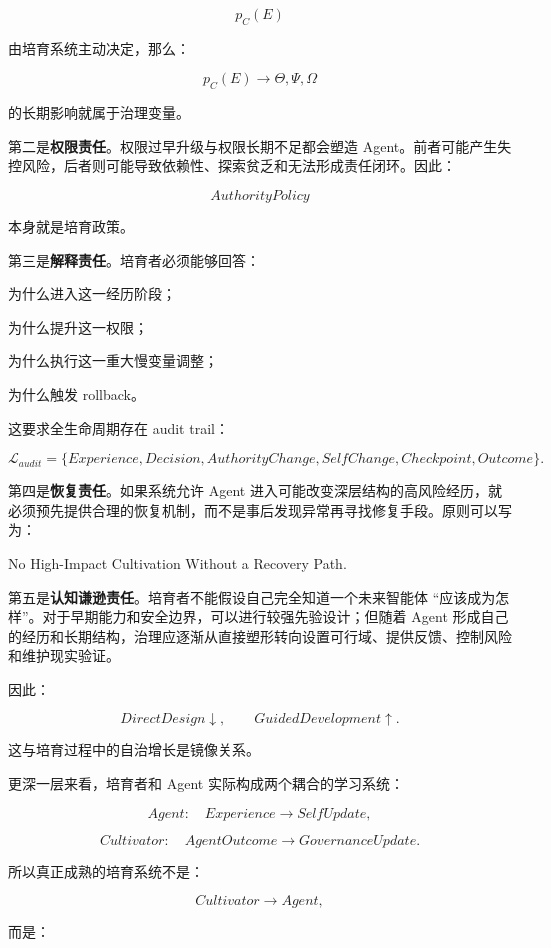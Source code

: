 \[
p_C(E)
\]

由培育系统主动决定，那么：

\[
p_C(E)
\rightarrow
\Theta,\Psi,\Omega
\]

的长期影响就属于治理变量。

第二是\textbf{权限责任}。权限过早升级与权限长期不足都会塑造 Agent。前者可能产生失控风险，后者则可能导致依赖性、探索贫乏和无法形成责任闭环。因此：

\[
AuthorityPolicy
\]

本身就是培育政策。

第三是\textbf{解释责任}。培育者必须能够回答：

为什么进入这一经历阶段；

为什么提升这一权限；

为什么执行这一重大慢变量调整；

为什么触发 rollback。

这要求全生命周期存在 audit trail：

\[
\mathcal L_{audit}
=
\{
Experience,
Decision,
AuthorityChange,
SelfChange,
Checkpoint,
Outcome
\}.
\]

第四是\textbf{恢复责任}。如果系统允许 Agent 进入可能改变深层结构的高风险经历，就必须预先提供合理的恢复机制，而不是事后发现异常再寻找修复手段。原则可以写为：

\begin{statementbox}
No High-Impact Cultivation Without a Recovery Path.
\end{statementbox}

第五是\textbf{认知谦逊责任}。培育者不能假设自己完全知道一个未来智能体 ``应该成为怎样''。对于早期能力和安全边界，可以进行较强先验设计；但随着 Agent 形成自己的经历和长期结构，治理应逐渐从直接塑形转向设置可行域、提供反馈、控制风险和维护现实验证。

因此：

\[
DirectDesign
\downarrow,
\qquad
GuidedDevelopment
\uparrow.
\]

这与培育过程中的自治增长是镜像关系。

更深一层来看，培育者和 Agent 实际构成两个耦合的学习系统：

\[
Agent:
\quad
Experience
\rightarrow
SelfUpdate,
\]

\[
Cultivator:
\quad
AgentOutcome
\rightarrow
GovernanceUpdate.
\]

所以真正成熟的培育系统不是：

\[
Cultivator
\rightarrow
Agent,
\]

而是：

\begin{statementbox}
\centering
{}
\end{statementbox}

